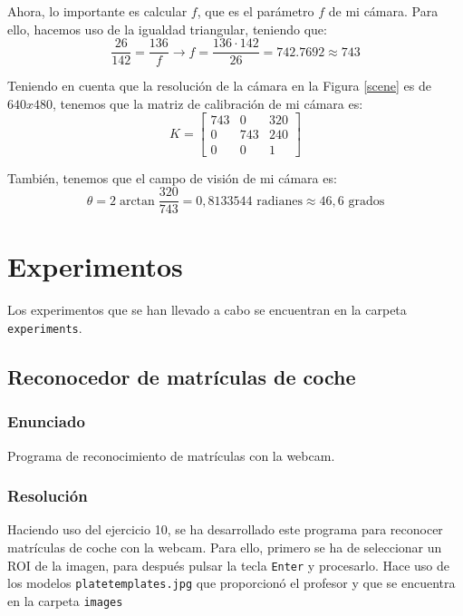 \documentclass[a4paper,10pt,titlepage,oneside,openright]{book}
\begin{document}
Ahora, lo importante es calcular $f$, que es el parámetro $f$ de mi cámara. Para ello, hacemos uso de la igualdad triangular, teniendo que:
$$\frac{26}{142} = \frac{136}{f} \rightarrow f = \frac{136\cdot142}{26} = 742.7692 \approx 743$$

Teniendo en cuenta que la resolución de la cámara en la Figura \ref{scene} es de $640x480$, tenemos que la matriz de calibración de mi cámara es:
$$K = \left[ 
\begin{array}{ccc}
 743 & 0 & 320 \\
 0 & 743 & 240 \\
 0 & 0 & 1
\end{array} 
\right]
$$

También, tenemos que el campo de visión de mi cámara es:
$$\theta = 2 \arctan \frac{320}{743} = 0,8133544 \mbox{ radianes} \approx 46,6 \mbox{ grados}$$
\medskip
\section{Experimentos}
Los experimentos que se han llevado a cabo se encuentran en la carpeta \texttt{experiments}.

\medskip
\subsection{Reconocedor de matrículas de coche}

\subsubsection*{Enunciado}
Programa de reconocimiento de matrículas con la webcam.

\subsubsection*{Resolución}
Haciendo uso del ejercicio 10, se ha desarrollado este programa para reconocer matrículas de coche con la webcam. Para ello, primero se ha de seleccionar un ROI de la imagen, para después pulsar la tecla \texttt{Enter} y procesarlo. Hace uso de los modelos \texttt{platetemplates.jpg} que proporcionó el profesor y que se encuentra en la carpeta \texttt{images}
\end{document}
